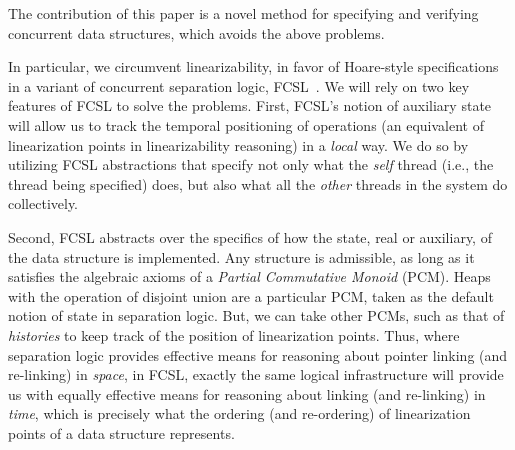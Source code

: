 The contribution of this paper is a novel method for specifying and
verifying concurrent data structures, which avoids the above problems.


In particular, we circumvent linearizability, in favor of Hoare-style
specifications in a variant of concurrent separation logic,
FCSL~\cite{LeyWild-Nanevski:POPL13,Nanevski-al:ESOP14}. We will rely
on two key features of FCSL to solve the problems. First, FCSL's
notion of auxiliary state will allow us to track the temporal
positioning of operations (an equivalent of linearization points in
linearizability reasoning) in a \emph{local} way. We do so by
utilizing FCSL abstractions that specify not only what the \emph{self}
thread (i.e., the thread being specified) does, but also what all the
\emph{other} threads in the system do collectively.

Second, FCSL abstracts over the specifics of how the state, real or
auxiliary, of the data structure is implemented. Any structure is
admissible, as long as it satisfies the algebraic axioms of a
\emph{Partial Commutative Monoid} (PCM). Heaps with the operation of
disjoint union are a particular PCM, taken as the default notion of
state in separation logic. But, we can take other PCMs, such as that
of \emph{histories} to keep track of the position of linearization
points. Thus, where separation logic provides effective means for
reasoning about pointer linking (and re-linking) in \emph{space}, in
FCSL, exactly the same logical infrastructure will provide us with
equally effective means for reasoning about linking (and re-linking)
in \emph{time}, which is precisely what the ordering (and re-ordering)
of linearization points of a data structure represents.

